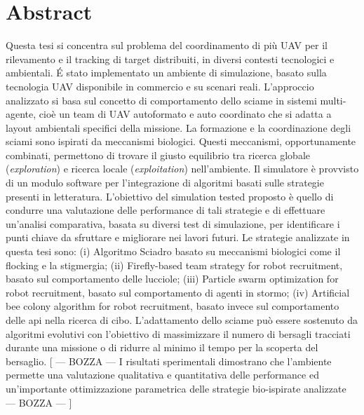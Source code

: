 \chapter*{Abstract}

Questa tesi si concentra sul problema del coordinamento di più UAV per il rilevamento e il tracking di target distribuiti, in diversi contesti tecnologici e ambientali. 
\'E stato implementato un ambiente di simulazione, basato sulla tecnologia UAV disponibile in commercio e su scenari reali. 
L'approccio analizzato si basa sul concetto di comportamento dello sciame in sistemi multi-agente, cioè un team di UAV autoformato e auto coordinato che si adatta a layout ambientali specifici della missione. 
La formazione e la coordinazione degli sciami sono ispirati da meccanismi biologici.
Questi meccanismi, opportunamente combinati, permettono di trovare il giusto equilibrio tra ricerca globale (\textit{exploration}) e ricerca locale (\textit{exploitation}) nell'ambiente. 
Il simulatore è provvisto di un modulo software per l'integrazione di algoritmi basati sulle strategie presenti in letteratura.
L'obiettivo del simulation tested proposto è quello di condurre una valutazione delle performance di tali strategie e di effettuare un'analisi comparativa, basata su diversi test di simulazione, per identificare i punti chiave da sfruttare e migliorare nei lavori futuri. 
Le strategie analizzate in questa tesi sono: (i) Algoritmo Sciadro basato su meccanismi biologici come il flocking e la stigmergia; (ii) Firefly-based team strategy for robot recruitment, basato sul comportamento delle lucciole; (iii) Particle swarm optimization for robot recruitment, basato sul comportamento di agenti in stormo; (iv) Artificial bee colony algorithm for robot recruitment, basato invece sul comportamento delle api nella ricerca di cibo.
L'adattamento dello sciame può essere sostenuto da algoritmi evolutivi con l'obiettivo di massimizzare il numero di bersagli tracciati durante una missione o di ridurre al minimo il tempo per la scoperta del bersaglio. 
[ --- BOZZA --- I risultati sperimentali dimostrano che l'ambiente permette una valutazione qualitativa e quantitativa delle performance ed un'importante ottimizzazione parametrica delle strategie bio-ispirate analizzate --- BOZZA --- ]

\restoregeometry

